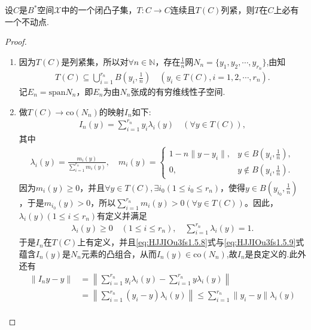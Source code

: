 \documentclass[../../main.tex]{subfiles}%
\begin{document}
\begin{theorem}[Schauder不动点定理]\label{theorem:泛函分析---Schauder不动点定理}
设$C$是$B^*$空间$\mathscr{X}$中的一个闭凸子集，$T: C \to C$连续且$T(C)$列紧，则$T$在$C$上必有一个不动点.
\end{theorem}
\begin{proof}
\begin{enumerate}[(1)]
\item 因为$T(C)$是列紧集，所以对$\forall n \in \mathbb{N}$，存在$\frac{1}{n}$网$N_n = \{y_1, y_2, \cdots, y_{r_n}\}$,由知
\begin{align*}
T(C) \subseteq \bigcup\limits_{i=1}^{r_n} B\left(y_i, \frac{1}{n}\right) \quad (y_i \in T(C), i = 1, 2, \cdots, r_n).
\end{align*}
记$E_n = \mathrm{span}N_n$，即$E_n$为由$N_n$张成的有穷维线性子空间.
\item 做$T(C) \to \mathrm{co}(N_n)$的映射$I_n$如下:
\begin{align}
I_n(y) = \sum\limits_{i=1}^{r_n} y_i \lambda_i(y) \quad (\forall y \in T(C)), \label{eq:HJJIOu3fs1.5.8}
\end{align}
其中
\begin{align*}
\lambda_i(y) = \frac{m_i(y)}{\sum\limits_{i=1}^{r_n} m_i(y)},
\quad
m_i(y) = \begin{cases}
1 - n\|y - y_i\|, & y \in B\left(y_i, \frac{1}{n}\right), \\
0, & y \notin B\left(y_i, \frac{1}{n}\right).
\end{cases}
\end{align*}
因为$m_i(y) \geqslant 0$，并且$\forall y \in T(C), \exists i_0(1 \leqslant i_0 \leqslant r_n)$，使得$y \in B\left(y_{i_0}, \frac{1}{n}\right)$，于是$m_{i_0}(y) > 0$，所以$\sum\limits_{i=1}^{r_n} m_i(y) > 0(\forall y \in T(C))$。因此，$\lambda_i(y)(1 \leqslant i \leqslant r_n)$有定义并满足
\begin{align}
\lambda_i(y) \geqslant 0 \quad (1 \leqslant i \leqslant r_n), \quad \sum\limits_{i=1}^{r_n} \lambda_i(y) = 1. \label{eq:HJJIOu3fs1.5.9}
\end{align}
于是$I_n$在$T(C)$上有定义，并且\eqref{eq:HJJIOu3fs1.5.8}式与\eqref{eq:HJJIOu3fs1.5.9}式蕴含$I_n(y)$是$N_n$元素的凸组合，从而$I_n(y) \in \mathrm{co}(N_n)$,故$I_n$是良定义的.此外还有
\begin{align*}
\|I_n y - y\| &= \left\| \sum\limits_{i=1}^{r_n} y_i \lambda_i(y) - \sum\limits_{i=1}^{r_n} y \lambda_i(y) \right\| \\
&= \left\| \sum\limits_{i=1}^{r_n} (y_i - y) \lambda_i(y) \right\| \leqslant \sum\limits_{i=1}^{r_n} \|y_i - y\| \lambda_i(y) \\

\end{align*}
\end{enumerate}
\end{proof}
\end{document}
